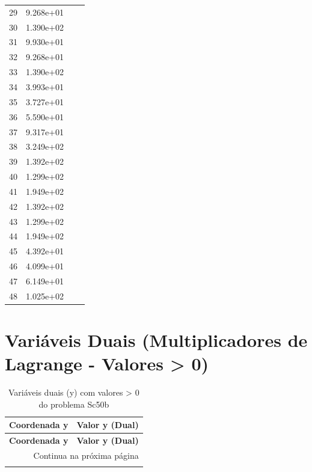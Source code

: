 \documentclass[12pt]{article}
\begin{document}
\begin{longtable}{@{}cccc@{}}
29 & 9.268e+01 &  &  \\
30 & 1.390e+02 &  &  \\
31 & 9.930e+01 &  &  \\
32 & 9.268e+01 &  &  \\
33 & 1.390e+02 &  &  \\
34 & 3.993e+01 &  &  \\
35 & 3.727e+01 &  &  \\
36 & 5.590e+01 &  &  \\
37 & 9.317e+01 &  &  \\
38 & 3.249e+02 &  &  \\
39 & 1.392e+02 &  &  \\
40 & 1.299e+02 &  &  \\
41 & 1.949e+02 &  &  \\
42 & 1.392e+02 &  &  \\
43 & 1.299e+02 &  &  \\
44 & 1.949e+02 &  &  \\
45 & 4.392e+01 &  &  \\
46 & 4.099e+01 &  &  \\
47 & 6.149e+01 &  &  \\
48 & 1.025e+02 &  &  \\

\bottomrule
\end{longtable}


\section{Variáveis Duais (Multiplicadores de Lagrange - Valores > 0)}

\begin{longtable}{@{}cc@{}}
\caption{Variáveis duais (y) com valores > 0 do problema Sc50b} \\
\toprule
\textbf{Coordenada y} & \textbf{Valor y (Dual)} \\
\midrule
\endfirsthead

\toprule
\textbf{Coordenada y} & \textbf{Valor y (Dual)} \\
\midrule
\endhead

\midrule \multicolumn{2}{r}{{Continua na próxima página}} \\ \midrule
\endfoot

\bottomrule
\endlastfoot

\bottomrule
\end{longtable}
\end{document}
